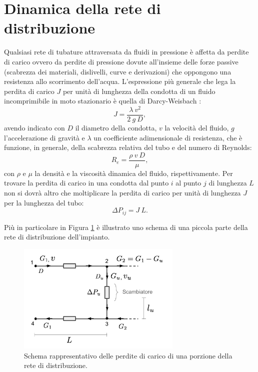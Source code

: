 \documentclass[laurea,oneside,11pt]{USiena_tesiLM3}
\begin{document}
\section{Dinamica della rete di distribuzione}
Qualsiasi rete di tubature attraversata da fluidi in pressione è affetta da perdite di carico ovvero da perdite di pressione dovute all'insieme delle forze passive (scabrezza dei materiali, dislivelli, curve e derivazioni) che oppongono una resistenza allo scorrimento dell'acqua. L'espressione più generale che lega la perdita di carico $J$ per unità di lunghezza della condotta di un fluido incomprimibile in moto stazionario è quella di Darcy-Weisbach \cite{darcy}:
\begin{equation}
J = \frac{\lambda \ v^2}{2 \ g \ D} ,
\end{equation}
avendo indicato con $D$ il diametro della condotta, $v$ la velocità del fluido, $g$ l'accelerazione di gravità e $\lambda$ un coefficiente adimensionale di resistenza, che è funzione, in generale, della scabrezza relativa del tubo e del numero di Reynolds:
\begin{equation}
R_e = \frac{\rho \ v \ D}{\mu} ,
\end{equation}
con $\rho$ e $\mu$ la densità e la viscosità dinamica del fluido, rispettivamente. 
Per trovare la perdita di carico in una condotta dal punto $i$ al punto $j$ di lunghezza $L$ non si dovrà altro che moltiplicare la perdita di carico per unità di lunghezza $J$ per la lunghezza del tubo:
\begin{equation}
\Delta P_{ij} = J \ L .
\end{equation} 
 
Più in particolare in Figura \ref{fig:perdite_carico} è illustrato uno schema di una piccola parte della rete di distribuzione dell'impianto.

\begin{figure}[h]
\centering
\includegraphics[width=0.70\textwidth]{figure/perdite_carico} %
\caption{Schema rappresentativo delle perdite di carico di una porzione della rete di distribuzione.}
\label{fig:perdite_carico}

\end{figure}
\end{document}

